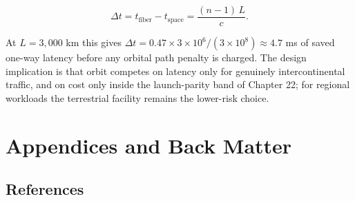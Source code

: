 \documentclass[
  11pt,
  openany,
  oneside]{book}
\begin{document}
\begin{equation}
\Delta t = t_{\mathrm{fiber}} - t_{\mathrm{space}} = \frac{(n-1)\,L}{c}. \tag{29.3}
\end{equation}

At \(L = 3{,}000\) km this gives
\(\Delta t = 0.47 \times 3{\times}10^{6}/(3{\times}10^{8}) \approx 4.7\)
ms of saved one-way latency before any orbital path penalty is charged.
The design implication is that orbit competes on latency only for
genuinely intercontinental traffic, and on cost only inside the
launch-parity band of Chapter 22; for regional workloads the terrestrial
facility remains the lower-risk choice.

\part{Appendices and Back Matter}\label{appendices-and-back-matter}

\chapter{References}\label{references}
\end{document}
